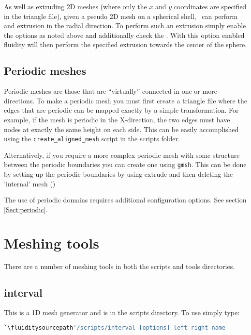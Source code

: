 As well as extruding 2D meshes (where only the $x$ and $y$ coordinates are specified in the triangle file),
given a pseudo 2D mesh on a spherical shell, \fluidity\ can perform and extrusion in the radial 
direction. To perform such an extrusion simply enable the options as noted above and additionally 
check the . With this option enabled fluidity will then perform the 
specified extrusion towards the center of the sphere.

\subsection{Periodic meshes}
\label{mesh!mesh types!periodic} 
Periodic meshes are those that are ``virtually'' connected in one or more directions. To make a periodic
mesh you must first create a triangle file where the edges that are periodic
can be mapped exactly by a simple transformation. For example, if the mesh
is periodic in the X-direction, the two edges must have nodes at exactly the
same height on each side. This can be easily accomplished using the
\lstinline[language=Bash]+create_aligned_mesh+ script in the scripts folder.

Alternatively, if you require a more complex periodic mesh with some structure between the periodic 
boundaries you can create one using \lstinline[language=Bash]{gmsh}. This can be done by 
setting up the periodic boundaries by using extrude and then deleting the 'internal' mesh (\website)

The use of periodic domains requires additional configuration options. See
section \ref{Sect:periodic}.

\section{Meshing tools}

There are a number of meshing tools in both the scripts and tools directories.

\subsection{interval}
This is a 1D mesh generator and is in the scripts directory. To use simply type:


\begin{lstlisting}[language = Bash]
`\fluiditysourcepath'/scripts/interval [options] left right name 
\end{lstlisting}

